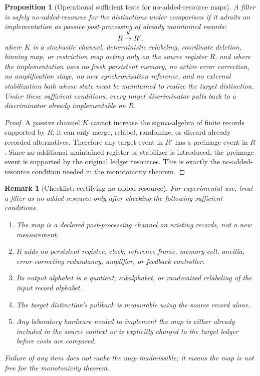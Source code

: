 \documentclass[11pt]{article}
\newtheorem{proposition}[theorem]{Proposition}
\newtheorem{remark}[theorem]{Remark}
\begin{document}
\begin{proposition}[Operational sufficient tests for no-added-resource maps]\label{prop:no-added-resource-sufficient-tests}
A filter is safely no-added-resource for the distinctions under comparison if it admits an implementation as passive post-processing of already maintained records:
\[
  R \xrightarrow{K} R',
\]
where $K$ is a stochastic channel, deterministic relabeling, coordinate deletion, binning map, or restriction map acting only on the source register $R$, and where the implementation uses no fresh persistent memory, no active error correction, no amplification stage, no new synchronization reference, and no external stabilization bath whose state must be maintained to realize the target distinction.  Under these sufficient conditions, every target discriminator pulls back to a discriminator already implementable on $R$.
\end{proposition}
\begin{proof}
A passive channel $K$ cannot increase the sigma-algebra of finite records supported by $R$; it can only merge, relabel, randomize, or discard already recorded alternatives.  Therefore any target event in $R'$ has a preimage event in $R$.  Since no additional maintained register or stabilizer is introduced, the preimage event is supported by the original ledger resources.  This is exactly the no-added-resource condition needed in the monotonicity theorem.
\end{proof}

\begin{remark}[Checklist: certifying no-added-resource]\label{check:no-added-resource}
For experimental use, treat a filter as no-added-resource only after checking the following sufficient conditions.
\begin{enumerate}[label=(\roman*),leftmargin=2em]
\item The map is a declared post-processing channel on existing records, not a new measurement.
\item It adds no persistent register, clock, reference frame, memory cell, ancilla, error-correcting redundancy, amplifier, or feedback controller.
\item Its output alphabet is a quotient, subalphabet, or randomized relabeling of the input record alphabet.
\item The target distinction's pullback is measurable using the source record alone.
\item Any laboratory hardware needed to implement the map is either already included in the source context or is explicitly charged to the target ledger before costs are compared.
\end{enumerate}
Failure of any item does not make the map inadmissible; it means the map is not free for the monotonicity theorem.
\end{remark}
\end{document}
